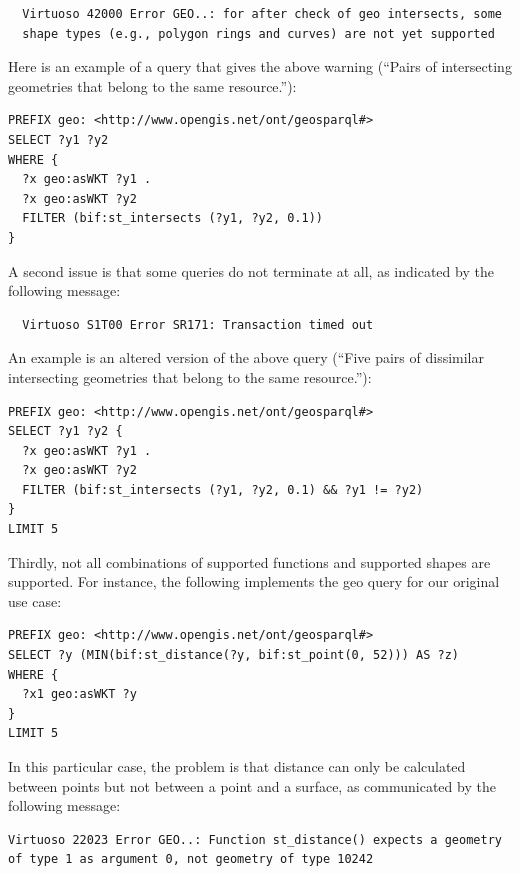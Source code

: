 \documentclass[a4paper]{scrartcl}
\begin{document}
\begin{verbatim}
  Virtuoso 42000 Error GEO..: for after check of geo intersects, some
  shape types (e.g., polygon rings and curves) are not yet supported
\end{verbatim}

Here is an example of a query that gives the above warning (``Pairs of
intersecting geometries that belong to the same resource.''):

\begin{verbatim}
PREFIX geo: <http://www.opengis.net/ont/geosparql#>
SELECT ?y1 ?y2
WHERE {
  ?x geo:asWKT ?y1 .
  ?x geo:asWKT ?y2
  FILTER (bif:st_intersects (?y1, ?y2, 0.1))
}
\end{verbatim}

A second issue is that some queries do not terminate at all, as
indicated by the following message:

\begin{verbatim}
  Virtuoso S1T00 Error SR171: Transaction timed out
\end{verbatim}

An example is an altered version of the above query (``Five pairs of
dissimilar intersecting geometries that belong to the same
resource.''):

\begin{verbatim}
PREFIX geo: <http://www.opengis.net/ont/geosparql#>
SELECT ?y1 ?y2 {
  ?x geo:asWKT ?y1 .
  ?x geo:asWKT ?y2
  FILTER (bif:st_intersects (?y1, ?y2, 0.1) && ?y1 != ?y2)
}
LIMIT 5
\end{verbatim}

Thirdly, not all combinations of supported functions and supported
shapes are supported.  For instance, the following implements the geo
query for our original use case:

\begin{verbatim}
PREFIX geo: <http://www.opengis.net/ont/geosparql#>
SELECT ?y (MIN(bif:st_distance(?y, bif:st_point(0, 52))) AS ?z)
WHERE {
  ?x1 geo:asWKT ?y
}
LIMIT 5
\end{verbatim}

In this particular case, the problem is that distance can only be
calculated between points but not between a point and a surface, as
communicated by the following message:

\begin{verbatim}
Virtuoso 22023 Error GEO..: Function st_distance() expects a geometry
of type 1 as argument 0, not geometry of type 10242
\end{verbatim}
\end{document}
